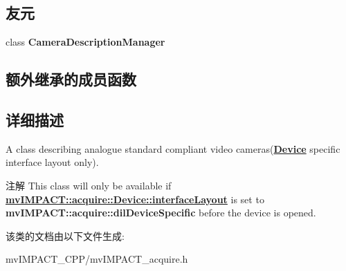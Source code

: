 \subsection*{友元}
\begin{DoxyCompactItemize}
\item 
\hypertarget{classmv_i_m_p_a_c_t_1_1acquire_1_1_camera_description_standard_a754f74db1fd8a2e7cf0bca76c10d00dd}{class {\bfseries Camera\+Description\+Manager}}\label{classmv_i_m_p_a_c_t_1_1acquire_1_1_camera_description_standard_a754f74db1fd8a2e7cf0bca76c10d00dd}

\end{DoxyCompactItemize}
\subsection*{额外继承的成员函数}


\subsection{详细描述}
A class describing analogue standard compliant video cameras({\bfseries \hyperlink{classmv_i_m_p_a_c_t_1_1acquire_1_1_device}{Device}} specific interface layout only). 

\begin{DoxyNote}{注解}
This class will only be available if {\bfseries \hyperlink{classmv_i_m_p_a_c_t_1_1acquire_1_1_device_ab4dd0ecc9d456bb5ddc01d844c9d6f2d}{mv\+I\+M\+P\+A\+C\+T\+::acquire\+::\+Device\+::interface\+Layout}} is set to {\bfseries mv\+I\+M\+P\+A\+C\+T\+::acquire\+::dil\+Device\+Specific} before the device is opened. 
\end{DoxyNote}


该类的文档由以下文件生成\+:\begin{DoxyCompactItemize}
\item 
mv\+I\+M\+P\+A\+C\+T\+\_\+\+C\+P\+P/mv\+I\+M\+P\+A\+C\+T\+\_\+acquire.\+h\end{DoxyCompactItemize}
